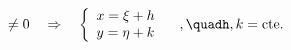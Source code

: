 \documentclass[preview]{standalone}
\begin{document}
\begin{align*}
\neq0\quad\Rightarrow\quad\left\{\begin{array}{l}x=\xi+h\\y=\eta+k\end{array}\right.\quad,\quadh,k=\text{cte.}
\end{align*}
\end{document}
